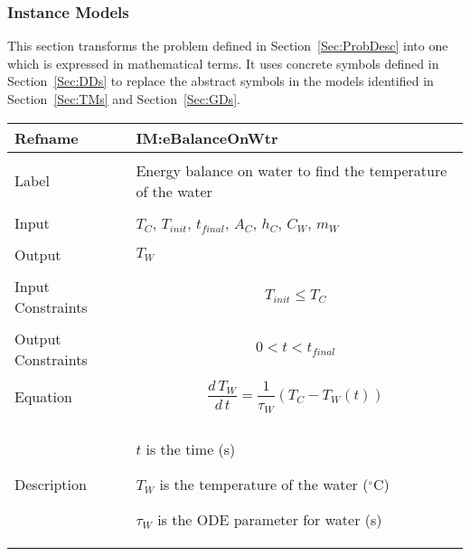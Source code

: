 \documentclass[12pt]{article}
\begin{document}
\subsubsection{Instance Models}
\label{Sec:IMs}
This section transforms the problem defined in Section~\ref{Sec:ProbDesc} into one which is expressed in mathematical terms. It uses concrete symbols defined in Section~\ref{Sec:DDs} to replace the abstract symbols in the models identified in Section~\ref{Sec:TMs} and Section~\ref{Sec:GDs}.
~\newline
\noindent \begin{minipage}{\textwidth}
\begin{tabular}{p{} p{}}
\toprule \textbf{Refname} & \textbf{IM:eBalanceOnWtr}
\label{IM:eBalanceOnWtr}
\\ \midrule \\
Label & Energy balance on water to find the temperature of the water
\\ \midrule \\
Input & ${T_{C}}$, ${T_{init}}$, ${t_{final}}$, ${A_{C}}$, ${h_{C}}$, ${C_{W}}$, ${m_{W}}$
\\ \midrule \\
Output & ${T_{W}}$
\\ \midrule \\
Input Constraints & \begin{dmath}
                    {T_{init}}\leq{}{T_{C}}
                    \end{dmath}
\\ \midrule \\
Output Constraints & \begin{dmath}
                     0<t<{t_{final}}
                     \end{dmath}
\\ \midrule \\
Equation & \begin{dmath}
           \frac{d\,{T_{W}}}{d\,t}=\frac{1}{{τ_{W}}} \left({T_{C}}-{T_{W}}\left(t\right)\right)
           \end{dmath}
\\ \midrule \\
Description & \begin{symbDescription}
              \item{$t$ is the time (s)}
              \item{${T_{W}}$ is the temperature of the water (${}^{\circ}$C)}
              \item{${τ_{W}}$ is the ODE parameter for water (s)}

\end{symbDescription}
\end{tabular}
\end{minipage}
\end{document}

